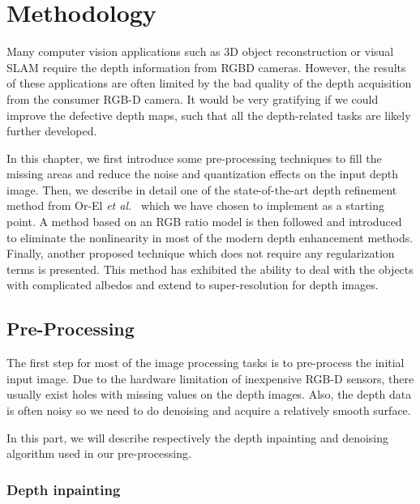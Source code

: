 \chapter{Methodology} \label{chap:methodology}
Many computer vision applications such as 3D object reconstruction or visual SLAM require the depth information from RGBD cameras. 
However, the results of these applications are often limited by the bad quality of the depth acquisition from the consumer RGB-D camera. 
It would be very gratifying if we could improve the defective depth maps, such that all the depth-related tasks are likely further developed.

In this chapter, we first introduce some pre-processing techniques to fill the missing areas and reduce the noise and quantization effects on the input depth image. 
Then, we describe in detail one of the state-of-the-art depth refinement method from Or-El \emph{et al.}~\cite{or2015rgbd} which we have chosen to implement as a starting point.
A method based on an RGB ratio model is then followed and introduced to eliminate the nonlinearity in most of the modern depth enhancement methods.
Finally, another proposed technique which does not require any regularization terms is presented. 
This method has exhibited the ability to deal with the objects with complicated albedos and extend to super-resolution for depth images.
 

\section{Pre-Processing}
The first step for most of the image processing tasks is to pre-process the initial input image. 
Due to the hardware limitation of inexpensive RGB-D sensors, there usually exist holes with missing values on the depth images. 
Also, the depth data is often noisy so we need to do denoising and acquire a relatively smooth surface.

In this part, we will describe respectively the depth inpainting and denoising algorithm used in our pre-processing. 
\subsection{Depth inpainting}

